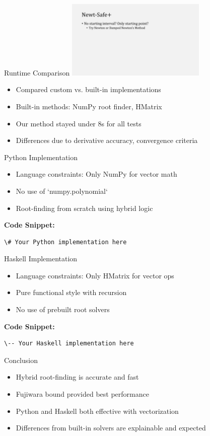 \documentclass{beamer}
\begin{document}
\begin{frame}{Runtime Comparison}
\includegraphics[width=0.5\textwidth]{context_frame_04.jpg}
\begin{itemize}
    \item Compared custom vs. built-in implementations
    \item Built-in methods: NumPy root finder, HMatrix
    \item Our method stayed under 8s for all tests
    \item Differences due to derivative accuracy, convergence criteria
\end{itemize}
\end{frame}

\begin{frame}{Python Implementation}
\begin{itemize}
    \item Language constraints: Only NumPy for vector math
    \item No use of `numpy.polynomial`
    \item Root-finding from scratch using hybrid logic
\end{itemize}
\vspace{1em}
\textbf{Code Snippet:}
\begin{verbatim}
\# Your Python implementation here
\end{verbatim}
\end{frame}

\begin{frame}{Haskell Implementation}
\begin{itemize}
    \item Language constraints: Only HMatrix for vector ops
    \item Pure functional style with recursion
    \item No use of prebuilt root solvers
\end{itemize}
\vspace{1em}
\textbf{Code Snippet:}
\begin{verbatim}
\-- Your Haskell implementation here
\end{verbatim}
\end{frame}

\begin{frame}{Conclusion}
\begin{itemize}
    \item Hybrid root-finding is accurate and fast
    \item Fujiwara bound provided best performance
    \item Python and Haskell both effective with vectorization
    \item Differences from built-in solvers are explainable and expected
\end{itemize}
\end{frame}
\end{document}
